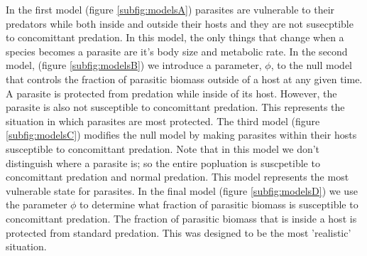 \documentclass[11pt]{amsart}
\begin{document}
In the first model (figure \ref{subfig:modelsA}) parasites are vulnerable to their predators while both inside and outside their hosts and they are not susecptible to concomittant predation.  In this model, the only things that change when a species becomes a parasite are it's body size and metabolic rate.  In the second model, (figure \ref{subfig:modelsB})  we introduce a parameter, $\phi$, to the null model that controls the fraction of parasitic biomass outside of a host at any given time.  A parasite is protected from predation while inside of its host.  However, the parasite is also not susceptible to concomittant predation.  This represents the situation in which parasites are most protected.  The third model (figure \ref{subfig:modelsC}) modifies the null model by making parasites within their hosts susceptible to concomittant predation.  Note that in this model we don't distinguish where a parasite is; so the entire popluation is suscpetible to concomittant predation and normal predation.  This model represents the most vulnerable state for parasites.  In the final model (figure \ref{subfig:modelsD}) we use the parameter $\phi$ to determine what fraction of parasitic biomass is susceptible to concomittant predation.  The fraction of parasitic biomass that is inside a host is protected from standard predation.  This was designed to be the most 'realistic' situation.
\end{document}
